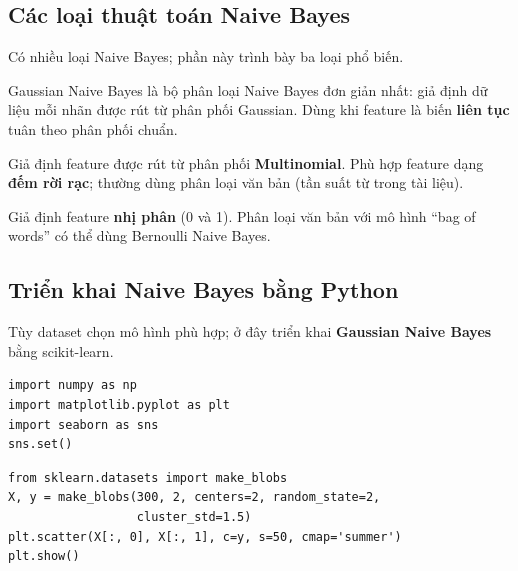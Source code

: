 \subsection{Các loại thuật toán Naive Bayes}

\begin{ynghia}[title={Nhiều biến thể}]
Có nhiều loại Naive Bayes; phần này trình bày ba loại phổ biến.
\end{ynghia}

\begin{dinhnghia}[title={Gaussian Naive Bayes}]
Gaussian Naive Bayes là bộ phân loại Naive Bayes đơn giản nhất: giả định dữ liệu mỗi nhãn được rút từ phân phối Gaussian.
Dùng khi feature là biến \textbf{liên tục} tuân theo phân phối chuẩn.
\end{dinhnghia}

\begin{dinhnghia}[title={Multinomial Naive Bayes}]
Giả định feature được rút từ phân phối \textbf{Multinomial}.
Phù hợp feature dạng \textbf{đếm rời rạc}; thường dùng phân loại văn bản (tần suất từ trong tài liệu).
\end{dinhnghia}

\begin{dinhnghia}[title={Bernoulli Naive Bayes}]
Giả định feature \textbf{nhị phân} (0 và 1).
Phân loại văn bản với mô hình ``bag of words'' có thể dùng Bernoulli Naive Bayes.
\end{dinhnghia}

\subsection{Triển khai Naive Bayes bằng Python}

\begin{dongco}[title={Gaussian Naive Bayes}]
Tùy dataset chọn mô hình phù hợp; ở đây triển khai \textbf{Gaussian Naive Bayes} bằng scikit-learn.
\end{dongco}

\begin{vidu}[title={Import}]
\begin{lstlisting}
import numpy as np
import matplotlib.pyplot as plt
import seaborn as sns
sns.set()
\end{lstlisting}
\end{vidu}

\begin{vidu}[title={Tạo blob phân phối Gaussian}]
\begin{lstlisting}
from sklearn.datasets import make_blobs
X, y = make_blobs(300, 2, centers=2, random_state=2,
                  cluster_std=1.5)
plt.scatter(X[:, 0], X[:, 1], c=y, s=50, cmap='summer')
plt.show()
\end{lstlisting}

\end{vidu}

